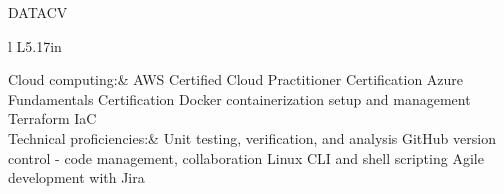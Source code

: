 \documentclass[letterpaper]{article}
\newenvironment{skillslist}
        {
            \hspace*{-0.07in}\begin{tabular}[t]{ l L{5.17in} }
        }{
            \end{tabular}
        }
\newcommand{\impt}[1]{\uline{#1}}
\begin{document}
\begin{taggedblock}{DATACV}
\begin{skillslist}
            Cloud computing:&
                AWS Certified Cloud Practitioner Certification \linebreak
                Azure Fundamentals Certification \linebreak
                Docker containerization setup and management \linebreak
                Terraform IaC \linebreak
                \\
            Technical proficiencies:&
                Unit testing, verification, and analysis\linebreak
                GitHub version control - code management, collaboration \linebreak
                Linux CLI and shell scripting \linebreak
                Agile development with Jira \linebreak
                \\
        \end{skillslist}
    \end{taggedblock}
\end{document}
